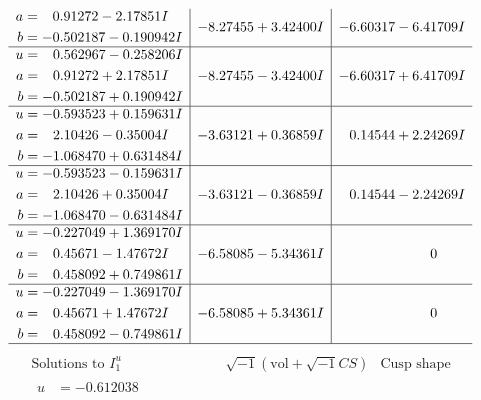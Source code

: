 \documentclass[1p]{elsarticle_modified}
\theoremstyle{definition}
\newcommand{\I}{\sqrt{-1}}
\begin{document}
$$\begin{array}{c|c|c}
\begin{aligned}
a &= \phantom{-}0.91272 - 2.17851 I \\
b &= -0.502187 - 0.190942 I\end{aligned}
 & -8.27455 + 3.42400 I & -6.60317 - 6.41709 I \\ \hline\begin{aligned}
u &= \phantom{-}0.562967 - 0.258206 I \\
a &= \phantom{-}0.91272 + 2.17851 I \\
b &= -0.502187 + 0.190942 I\end{aligned}
 & -8.27455 - 3.42400 I & -6.60317 + 6.41709 I \\ \hline\begin{aligned}
u &= -0.593523 + 0.159631 I \\
a &= \phantom{-}2.10426 - 0.35004 I \\
b &= -1.068470 + 0.631484 I\end{aligned}
 & -3.63121 + 0.36859 I & \phantom{-}0.14544 + 2.24269 I \\ \hline\begin{aligned}
u &= -0.593523 - 0.159631 I \\
a &= \phantom{-}2.10426 + 0.35004 I \\
b &= -1.068470 - 0.631484 I\end{aligned}
 & -3.63121 - 0.36859 I & \phantom{-}0.14544 - 2.24269 I \\ \hline\begin{aligned}
u &= -0.227049 + 1.369170 I \\
a &= \phantom{-}0.45671 - 1.47672 I \\
b &= \phantom{-}0.458092 + 0.749861 I\end{aligned}
 & -6.58085 - 5.34361 I & \phantom{-0.000000 } 0 \\ \hline\begin{aligned}
u &= -0.227049 - 1.369170 I \\
a &= \phantom{-}0.45671 + 1.47672 I \\
b &= \phantom{-}0.458092 - 0.749861 I\end{aligned}
 & -6.58085 + 5.34361 I & \phantom{-0.000000 } 0\\
 \hline 
 \end{array}$$\newpage$$\begin{array}{c|c|c}  
\text{Solutions to }I^u_{1}& \I (\text{vol} + \sqrt{-1}CS) & \text{Cusp shape}\\
 \hline 
\begin{aligned}
u &= -0.612038\phantom{ +0.000000I} \\

\end{aligned}
\end{array}$$
\end{document}
